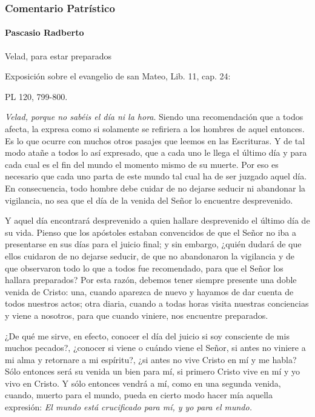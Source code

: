 \subsubsection{Comentario Patrístico}\label{comentario-patruxedstico}

\paragraph{Pascasio Radberto}\label{pascasio-radberto}

Velad, para estar preparados

Exposición sobre el evangelio de san Mateo, Lib. 11, cap. 24:

PL 120, 799-800.

\emph{Velad, porque no sabéis el día ni la hora}. Siendo una recomendación que a todos afecta, la expresa como si solamente se refiriera a los hombres de aquel entonces. Es lo que ocurre con muchos otros pasajes que leemos en las Escrituras. Y de tal modo atañe a todos lo así expresado, que a cada uno le llega el último día y para cada cual es el fin del mundo el momento mismo de su muerte. Por eso es necesario que cada uno parta de este mundo tal cual ha de ser juzgado aquel día. En consecuencia, todo hombre debe cuidar de no dejarse seducir ni abandonar la vigilancia, no sea que el día de la venida del Señor lo encuentre desprevenido.

Y aquel día encontrará desprevenido a quien hallare desprevenido el último día de su vida. Pienso que los apóstoles estaban convencidos de que el Señor no iba a presentarse en sus días para el juicio final; y sin embargo, ¿quién dudará de que ellos cuidaron de no dejarse seducir, de que no abandonaron la vigilancia y de que observaron todo lo que a todos fue recomendado, para que el Señor los hallara preparados? Por esta razón, debemos tener siempre presente una doble venida de Cristo: una, cuando aparezca de nuevo y hayamos de dar cuenta de todos nuestros actos; otra diaria, cuando a todas horas visita nuestras conciencias y viene a nosotros, para que cuando viniere, nos encuentre preparados.

¿De qué me sirve, en efecto, conocer el día del juicio si soy consciente de mis muchos pecados?, ¿conocer si viene o cuándo viene el Señor, si antes no viniere a mi alma y retornare a mi espíritu?, ¿si antes no vive Cristo en mí y me habla? Sólo entonces será su venida un bien para mí, si primero Cristo vive en mí y yo vivo en Cristo. Y sólo entonces vendrá a mí, como en una segunda venida, cuando, muerto para el mundo, pueda en cierto modo hacer mía aquella expresión: \emph{El mundo está crucificado 	para mí, y yo para el mundo.}

